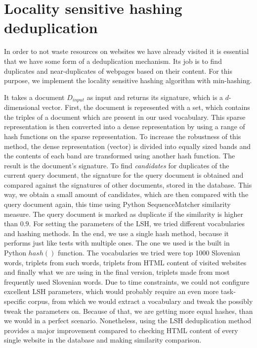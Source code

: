 \documentclass[9pt]{IEEEtran}
\begin{document}
\section{Locality sensitive hashing deduplication}

In order to not waste resources on websites we have already visited it is essential that we have some form of a deduplication mechanism.
Its job is to find duplicates and near-duplicates of webpages based on their content.
For this purpose, we implement the locality sensitive hashing algorithm \cite{Gionis1999} with min-hashing.

It takes a document $D_{input}$ as input and returns its signature, which is a $d$-dimensional vector.
First, the document is represented with a set, which contains the triples of a document which are present in our used vocabulary.
This sparse representation is then converted into a dense representation by using a range of hash functions on the sparse representation.
To increase the robustness of this method, the dense representation (vector) is divided into equally sized bands and the contents of each band are transformed using another hash function.
The result is the document's signature.
To find \textit{candidates} for duplicates of the current query document, the signature for the query document is obtained and compared against the signatures of other documents, stored in the database.
This way, we obtain a small amount of candidates, which are then compared with the query document again, this time using Python SequenceMatcher similarity measure.
The query document is marked as duplicate if the similarity is higher than $0.9$.
For setting the parameters of the LSH, we tried different vocabularies and hashing methods. 
In the end, we use a single hash method, because it performs just like tests with multiple ones.
The one we used is the built in Python $hash()$ function.
The vocabularies we tried were top 1000 Slovenian words, triplets from such words, triplets from HTML content of visited websites and finally what we are using in the final version, triplets made from most frequently used Slovenian words. 
Due to time constraints, we could not configure excellent LSH parameters, which would probably require an even more task-specific corpus, from which we would extract a vocabulary and tweak the possibly tweak the parameters on.
Because of that, we are getting more equal hashes, than we would in a perfect scenario.
Nonetheless, using the LSH deduplication method provides a major improvement compared to checking HTML content of every single website in the database and making similarity comparison.
\end{document}
